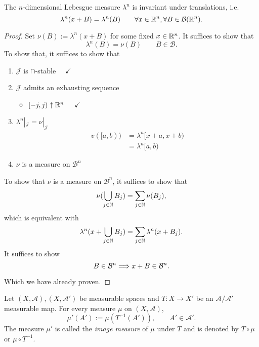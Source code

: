 \begin{thm}
The \(n\)-dimensional Lebesgue measure \(\lambda ^n\) is invariant under translations, i.e.
\[
\lambda ^n(x+B)=\lambda ^n(B) \qquad\forall x\in \Bbb{R}^n,\forall B\in \mathcal{B}(\Bbb{R}^n).
\]
\end{thm}

\begin{proof}
Set \(\nu (B):=\lambda ^n(x+B)\) for some fixed \(x\in \Bbb{R}^n\). It suffices to show that
\[
\lambda ^n(B)=\nu (B)\qquad B\in \mathcal{B}.
\]
To show that, it suffices to show that

\begin{enumerate}
  \item \(\mathcal{J}\) is \(\cap \)-stable $\quad \checkmark$
  \item \(\mathcal{J}\) admits an exhausting sequence
\begin{itemize}
  \item \([-j,j)\uparrow \Bbb{R}^n\) \(\quad \checkmark\)
\end{itemize}
  \item \(\lambda ^n|_\mathcal{J}=\nu |_\mathcal{J}\)
\begin{align*}
v([a,b))&=\lambda ^n[x+a,x+b) \\
&=\lambda ^n[a,b)
\end{align*}
  \item \(\nu \) is a measure on \(\mathcal{B}^n\)
\end{enumerate}

To show that \(\nu \) is a measure on \(\mathcal{B}^n\), it suffices to show that
\[
\nu (\bigcup _{j\in \Bbb{N}}B_{j})=\sum _{j\in \Bbb{N}}\nu (B_{j}),
\]
which is equivalent with
\[
\lambda ^n(x+\bigcup _{j\in \Bbb{N}}B_{j})=\sum _{j\in \Bbb{N}}\lambda ^n(x+B_{j}).
\]
It suffices to show
\[
B\in \mathcal{B}^n\space \Longrightarrow \space x+B\in \mathcal{B}^n.
\]

Which we have already proven.

\end{proof}

\begin{thm}
Let \((X,\mathcal{A}),(X,\mathcal{A}')\) be measurable spaces and \(T:X\rightarrow X'\) be an \(\mathcal{A}/\mathcal{A}'\) measurable map. For every measure \(\mu \) on \((X,\mathcal{A})\),
\[
\mu '(A'):=\mu (T^{-1}(A')), \qquad A'\in \mathcal{A}'.
\]
The measure \(\mu '\) is called the \emph{image measure} of \(\mu \) under \(T\) and is denoted by \(T\circ \mu \) or \(\mu \circ T^{-1}\).
\end{thm}

